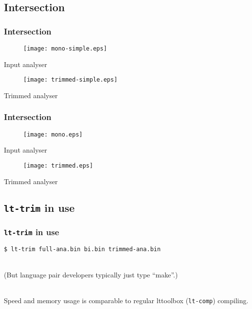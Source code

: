 \documentclass[notes=hide]{beamer}
\newcommand{\tool}[1]{\texttt{#1}}
\begin{document}
\subsection{Intersection}
\begin{frame}
  \frametitle{Intersection}
  \begin{center}

    \begin{figure}[h]
      \texttt{[image: mono-simple.eps]}
    \end{figure}
    \scriptsize{Input analyser}

    \begin{figure}[h]
      \texttt{[image: trimmed-simple.eps]}
    \end{figure}
    \scriptsize{Trimmed analyser}

  \end{center}
\end{frame}

\begin{frame}
  \frametitle{Intersection}
  \begin{center}

    \begin{figure}[h]
      \texttt{[image: mono.eps]}
    \end{figure}
    \scriptsize{Input analyser}

    \begin{figure}[h]
      \texttt{[image: trimmed.eps]}
    \end{figure}
    \scriptsize{Trimmed analyser}

  \end{center}
\end{frame}

\subsection{\tool{lt-trim} in use}
\begin{frame}
  \frametitle{\tool{lt-trim} in use}
  \tool{\$ lt-trim full-ana.bin bi.bin trimmed-ana.bin}

  ~\\

  (But language pair developers typically just type ``make''.)

  ~\\

  Speed and memory usage is comparable to regular lttoolbox
  (\tool{lt-comp}) compiling.
\end{frame}
\end{document}
